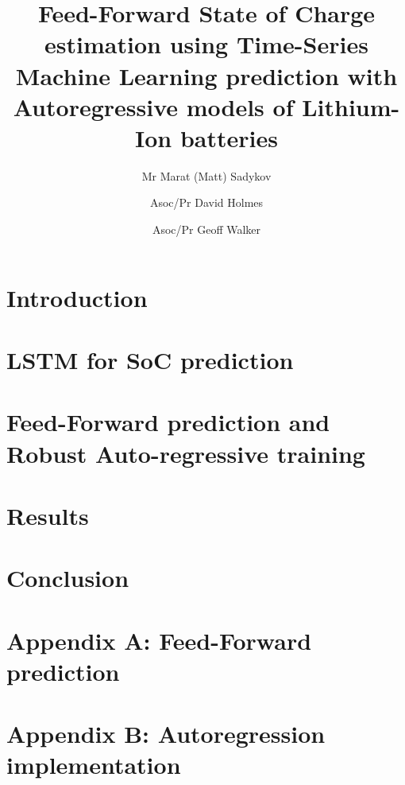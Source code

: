 \documentclass[fleqn,12pt]{olplainarticle}
\title{Feed-Forward State of Charge estimation using Time-Series Machine Learning prediction with Autoregressive models of Lithium-Ion batteries}
\author[1]{Mr Marat (Matt) Sadykov}
\author[2]{Asoc/Pr David Holmes}
\author[3]{Asoc/Pr Geoff Walker}
\affil[1]{Queensland University of Technology}
\begin{document}
\flushbottom
\maketitle
\thispagestyle{empty}
\section{Introduction} \label{sec:Introduction}

\section{LSTM for SoC prediction} \label{sec:layer}

\section{Feed-Forward prediction and Robust Auto-regressive training} \label{sec:feed}

\section{Results} \label{sec:results}

\section{Conclusion} \label{sec:conclussion}




\clearpage
\appendix
\section{Appendix A: Feed-Forward prediction}  \label{app:Feed-Forward}

\clearpage
\section{Appendix B: Autoregression implementation}  \label{app:AutoFeedback}

\end{document}
